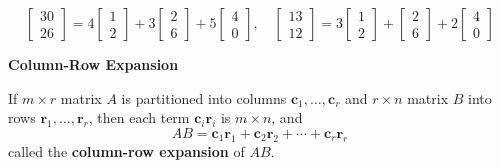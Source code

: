 \documentclass{article}
\newcommand{\redheading}[1]{{\vspace{2mm}\noindent\Large\bfseries\color{red!55!black} #1\par}\vspace{2mm}}
\theoremstyle{mystyle}
\begin{document}
\[
\begin{bmatrix}30\\26\end{bmatrix}=4\begin{bmatrix}1\\2\end{bmatrix}+3\begin{bmatrix}2\\6\end{bmatrix}+5\begin{bmatrix}4\\0\end{bmatrix},\quad
\begin{bmatrix}13\\12\end{bmatrix}=3\begin{bmatrix}1\\2\end{bmatrix}+\begin{bmatrix}2\\6\end{bmatrix}+2\begin{bmatrix}4\\0\end{bmatrix}
\]

\redheading{Column-Row Expansion}

If $m\times r$ matrix $A$ is partitioned into columns $\mathbf{c}_1,\dots,\mathbf{c}_r$ and $r\times n$ matrix $B$ into rows $\mathbf{r}_1,\dots,\mathbf{r}_r$, then each term $\mathbf{c}_i\mathbf{r}_i$ is $m\times n$, and
\[
AB=\mathbf{c}_1\mathbf{r}_1+\mathbf{c}_2\mathbf{r}_2+\cdots+\mathbf{c}_r\mathbf{r}_r \tag{11}
\]
called the \textbf{column-row expansion} of $AB$.
\end{document}

